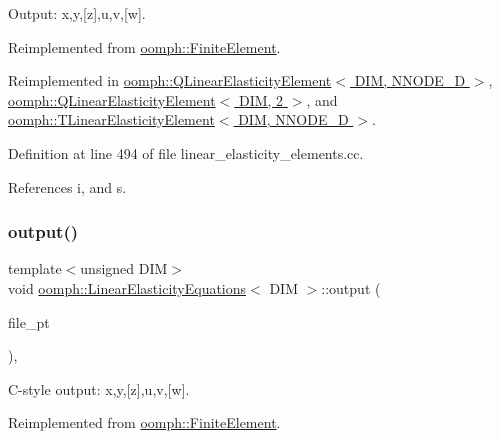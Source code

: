 Output\+: x,y,\mbox{[}z\mbox{]},u,v,\mbox{[}w\mbox{]}. 



Reimplemented from \hyperlink{classoomph_1_1FiniteElement_afa9d9b2670f999b43e6679c9dd28c457}{oomph\+::\+Finite\+Element}.



Reimplemented in \hyperlink{classoomph_1_1QLinearElasticityElement_a60eeaa0b23deb65a39b2d5bd41540963}{oomph\+::\+Q\+Linear\+Elasticity\+Element$<$ D\+I\+M, N\+N\+O\+D\+E\+\_\+D $>$}, \hyperlink{classoomph_1_1QLinearElasticityElement_a60eeaa0b23deb65a39b2d5bd41540963}{oomph\+::\+Q\+Linear\+Elasticity\+Element$<$ D\+I\+M, 2 $>$}, and \hyperlink{classoomph_1_1TLinearElasticityElement_acb51af6914538bf87852b892dc516ec0}{oomph\+::\+T\+Linear\+Elasticity\+Element$<$ D\+I\+M, N\+N\+O\+D\+E\+\_\+D $>$}.



Definition at line 494 of file linear\+\_\+elasticity\+\_\+elements.\+cc.



References i, and s.

\mbox{\label{classoomph_1_1LinearElasticityEquations_a5ece3b89bf886d39782820e449a4edaa}} 
\subsubsection{\texorpdfstring{output()}{output()}\hspace{0.1cm}{\footnotesize\ttfamily [3/4]}}
{\footnotesize\ttfamily template$<$unsigned D\+IM$>$ \\
void \hyperlink{classoomph_1_1LinearElasticityEquations}{oomph\+::\+Linear\+Elasticity\+Equations}$<$ D\+IM $>$\+::output (\begin{DoxyParamCaption}\item[{F\+I\+LE $\ast$}]{file\+\_\+pt }\end{DoxyParamCaption})\hspace{0.3cm}{\ttfamily [inline]}, {\ttfamily [virtual]}}



C-\/style output\+: x,y,\mbox{[}z\mbox{]},u,v,\mbox{[}w\mbox{]}. 



Reimplemented from \hyperlink{classoomph_1_1FiniteElement_a72cddd09f8ddbee1a20a1ff404c6943e}{oomph\+::\+Finite\+Element}.



